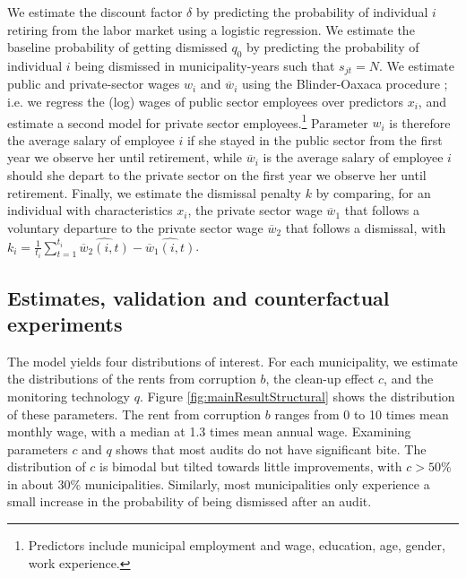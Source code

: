 \documentclass[12pt,a4paper]{article}
\theoremstyle{definition}
\newcommand{\wb}{\overline{w}}
\begin{document}
{We estimate the discount factor $\delta$ by predicting the probability of individual $i$ retiring from the labor market using a logistic regression. We estimate the baseline probability of getting dismissed $q_0$ by predicting the probability of individual $i$ being dismissed in municipality-years such that $s_{jt} = N$. We estimate public and private-sector wages $w_i$ and $\wb_i$ using the Blinder-Oaxaca procedure \citep{blinder1973wage}; i.e. we regress the (log) wages of public sector employees over predictors $x_i$, and estimate a second model for private sector employees.\footnote{Predictors include municipal employment and wage, education, age, gender, work experience.} Parameter $w_i$ is therefore the average salary of employee $i$ if she stayed in the public sector from the first year we observe her until retirement, while $\wb_i$ is the average salary of employee $i$ should she depart to the private sector on the first year we observe her until retirement. Finally, we estimate the dismissal penalty $k$ by comparing, for an individual with characteristics $x_i$, the private sector wage $\wb_1$ that follows a voluntary departure to the private sector wage $\wb_2$ that follows a dismissal, with $k_i = \frac{1}{t_i} \sum_{t=1}^{t_i} \widehat{\wb_2(i,t)} - \widehat{\wb_1(i,t)}$.

\subsection{Estimates, validation and counterfactual experiments}

The model yields four distributions of interest. For each municipality, we estimate the distributions of the rents from corruption $b$, the clean-up effect $c$, and the monitoring technology $q$. Figure \ref{fig:mainResultStructural} shows the distribution of these parameters. The rent from corruption $b$ ranges from 0 to 10 times mean monthly wage, with a median at 1.3 times mean annual wage. Examining parameters $c$ and $q$ shows that most audits do not have significant bite. The distribution of $c$ is bimodal but tilted towards little improvements, with $c > 50\%$ in about 30\% municipalities. Similarly, most municipalities only experience a small increase in the probability of being dismissed after an audit. 

}
\end{document}

